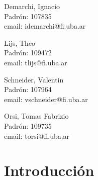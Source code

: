 \documentclass{article}
\begin{document}
\begin{titlepage}
\begin{center}
    {\begin{minipage}{.5\textwidth}
        \begin{center}
          Demarchi, Ignacio\\
          {\small{Padrón: 107835}}\\
          {\small{email: idemarchi@fi.uba.ar}}\\
        \end{center}
      \end{minipage}\begin{minipage}{.5\textwidth}
        \begin{center}
          Lijs, Theo\\
          {\small{Padrón: 109472}}\\
          {\small{email: tlijs@fi.uba.ar}}
        \end{center}
      \end{minipage}}

    \vspace{1.0cm}

    {\begin{minipage}{.5\textwidth}
        \begin{center}
          Schneider, Valentin\\
          {\small{Padrón: 107964}}\\
          {\small{email: vschneider@fi.uba.ar}}\\
        \end{center}
      \end{minipage}\begin{minipage}{.5\textwidth}
        \begin{center}
          Orsi, Tomas Fabrizio\\
          {\small{Padrón: 109735}}\\
          {\small{email: torsi@fi.uba.ar}}
        \end{center}
      \end{minipage}}

  \end{center}
\end{titlepage}

\tableofcontents
\pagebreak

\section{\texorpdfstring{\textbf{Introducción}}{Introducción}}\label{introducciuxf3n}
\end{document}
